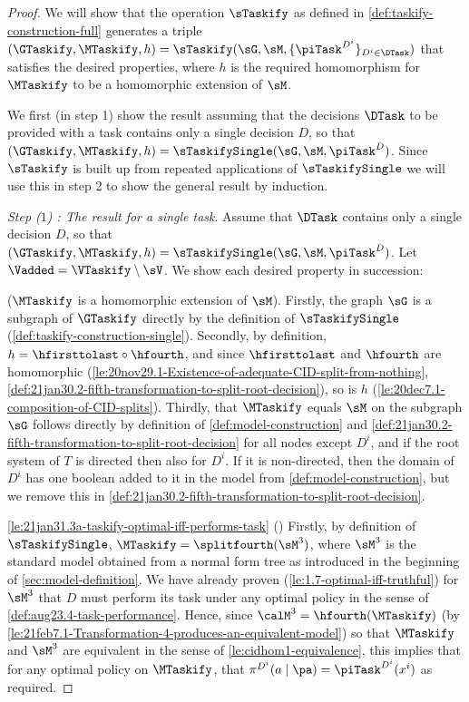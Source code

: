 \begin{proof}
We will show that the operation $\sTaskify$ as defined in \autoref{def:taskify-construction-full} generates a triple $(\GTaskify, \MTaskify,h)=\sTaskify(\sG, \sM, \{\piTask^{D^i}\}_{D^i\in \DTask})$ that satisfies the desired properties, where $h$ is the required homomorphism for $\MTaskify$ to be a homomorphic extension of $\sM$.


We first (in step 1) show the result assuming that the decisions $\DTask$ to be provided with a task contains only a single decision $D$, so that $(\GTaskify, \MTaskify,h)= \sTaskifySingle(\sG, \sM, \piTask^{D})$. Since $\sTaskify$ is built up from repeated applications of $\sTaskifySingle$ we will use this in step 2 to show the general result by induction.



\textit{Step ($1$) : The result for a single task}. 
Assume that $\DTask$ contains only a single decision $D$, so that $(\GTaskify, \MTaskify,h)= \sTaskifySingle(\sG, \sM, \piTask^{D})$. 
Let $\Vadded= \VTaskify \setminus \sV$. We show each desired property in succession:

($\MTaskify$ is a homomorphic extension of $\sM$). Firstly, the graph $\sG$ is a subgraph of $\GTaskify$ directly by the definition of $\sTaskifySingle$ (\autoref{def:taskify-construction-single}). Secondly, by definition, $h=\hfirsttolast\circ \hfourth$, and since $\hfirsttolast$ and $\hfourth$ are homomorphic (\autoref{le:20nov29.1-Existence-of-adequate-CID-split-from-nothing}, \autoref{def:21jan30.2-fifth-transformation-to-split-root-decision}), so is $h$ (\autoref{le:20dec7.1-composition-of-CID-splits}). Thirdly, that $\MTaskify$ equals $\sM$ on the subgraph $\sG$ follows directly by definition of \autoref{def:model-construction} and \autoref{def:21jan30.2-fifth-transformation-to-split-root-decision} for all nodes except $D^i$, and if the root system of $T$ is directed then also for $D^i$. If it is non-directed, then the domain of $D^i$ has one boolean added to it in the model from \autoref{def:model-construction}, but we remove this in \autoref{def:21jan30.2-fifth-transformation-to-split-root-decision}.

\ref{le:21jan31.3a-taskify-optimal-iff-performs-task} {(\TaskifySublemmaPerformsTheirTaskName)} 
Firstly, by definition of $\sTaskifySingle$, $\MTaskify=\splitfourth(\sM^3)$, where $\sM^3$ is the standard
model obtained from a normal form tree as introduced in the beginning of \autoref{sec:model-definition}. 
We have already proven (\autoref{le:1.7-optimal-iff-truthful}) for $\sM^3$ that $D$ must perform its task under any optimal policy in the sense of \autoref{def:aug23.4-task-performance}. Hence, since $\calM^3=\hfourth(\MTaskify)$ (by \autoref{le:21feb7.1-Transformation-4-produces-an-equivalent-model}) so that $\MTaskify$ and $\sM^3$ are equivalent in the sense of \autoref{le:cidhom1-equivalence}, this implies that for any optimal policy on $\MTaskify$, that $\pi^{D^i}(a\mid\pa)=\piTask^{D^i}(x^i)$ as required.




\end{proof}
